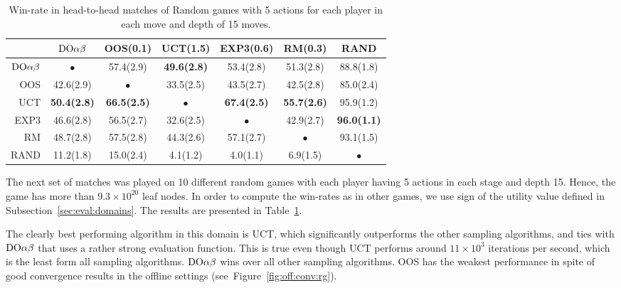 \begin{table}
\centering
\begin{scriptsize}

\begin{tabular}{|r|cccccc|}\hline
&$\textrm{DO}\alpha\beta$&OOS(0.1)&UCT(1.5)&EXP3(0.6)&RM(0.3)&RAND\\\hline
$\textrm{DO}\alpha\beta$&$\bullet$&57.4(2.9)&\textbf{49.6(2.8)}&53.4(2.8)&51.3(2.8)&88.8(1.8)\\
OOS&42.6(2.9)&$\bullet$&33.5(2.5)&43.5(2.7)&42.5(2.8)&85.0(2.4)\\
UCT&\textbf{50.4(2.8)}&\textbf{66.5(2.5)}&$\bullet$&\textbf{67.4(2.5)}&\textbf{55.7(2.6)}&95.9(1.2)\\
EXP3&46.6(2.8)&56.5(2.7)&32.6(2.5)&$\bullet$&42.9(2.7)&\textbf{96.0(1.1)}\\
RM&48.7(2.8)&57.5(2.8)&44.3(2.6)&57.1(2.7)&$\bullet$&93.1(1.5)\\
RAND&11.2(1.8)&15.0(2.4)&4.1(1.2)&4.0(1.1)&6.9(1.5)&$\bullet$\\
\hline
\end{tabular}

\end{scriptsize}
\caption{Win-rate in head-to-head matches of Random games with 5 actions for each player in each move and depth of 15 moves.}\label{fig:matches:rand}
\end{table}


The next set of matches was played on 10 different random games with each player having 5 actions in each stage and depth 15. Hence, the game has more than $9.3\times 10^{20}$ leaf nodes. In order to compute the win-rates as in other games, we use sign of the utility value defined in Subsection~\ref{sec:eval:domains}. The results are presented in Table~\ref{fig:matches:rand}.

The clearly best performing algorithm in this domain is UCT, which significantly outperforms the other sampling algorithms, and ties with $\textrm{DO}\alpha\beta$ that uses a rather strong evaluation function.
This is true even though UCT performs around $11 \times 10^3$ iterations per second, which is the least form all sampling algorithms.
$\textrm{DO}\alpha\beta$ wins over all other sampling algorithms.
OOS has the weakest performance in spite of good convergence results in the offline settings (see~Figure~\ref{fig:off:conv:rg}).

